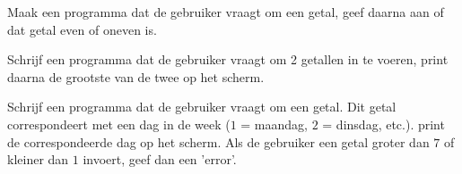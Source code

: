 \begin{exercise}
Maak een programma dat de gebruiker vraagt om een getal, geef daarna aan of dat getal even of oneven is.
\end{exercise}

\begin{exercise}
Schrijf een programma dat de gebruiker vraagt om 2 getallen in te voeren, print daarna de grootste van de twee op het scherm. 
\end{exercise}

\begin{exercise}
Schrijf een programma dat de gebruiker vraagt om een getal. Dit getal correspondeert met een dag in de week ($1$ = maandag, $2$ = dinsdag, etc.). print de correspondeerde dag op het scherm. Als de gebruiker een getal groter dan $7$ of kleiner dan $1$ invoert, geef dan een 'error'.
\end{exercise}

